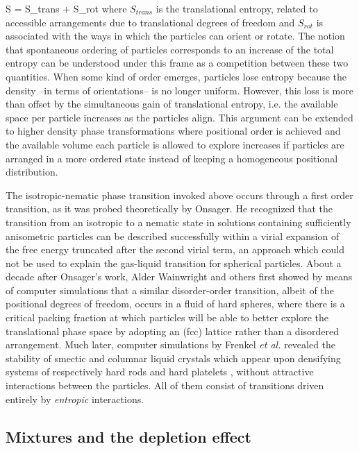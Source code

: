 \beq
S = S_{trans} + S_{rot}
\eeq
where $S_{trans}$ is the translational entropy, related to accessible arrangements due to translational degrees of freedom and $S_{rot}$ is associated with the ways in which the particles can orient or rotate. The notion that spontaneous ordering of particles corresponds to an increase of the total entropy can be understood under this frame as a competition between these two quantities. When some kind of order emerges, particles lose entropy because the density --in terms of orientations-- is no longer uniform. However, this loss is more than offset by the simultaneous gain of translational entropy, i.e.  the available space per particle increases as the particles align. This argument can be extended to higher density phase transformations where positional order is achieved and the available volume each particle is allowed to explore increases if particles are arranged in a more ordered state instead of keeping a homogeneous positional distribution.

The isotropic-nematic phase transition invoked above occurs through a first order transition, as it was probed theoretically by Onsager. He recognized that the transition from an isotropic to a nematic state in solutions containing sufficiently anisometric particles can be described successfully  within a virial expansion of the free energy truncated after the second virial term, an approach which could not be used to explain the gas-liquid transition for spherical particles. About a decade after Onsager's work, Alder Wainwright and others \cite{ALDER57,WOOD57} first showed by means of computer simulations that a similar disorder-order transition, albeit of the positional degrees of freedom, occurs in a fluid of hard spheres, where there is a critical packing fraction at which particles will be able to better explore the translational phase space by adopting an (fcc) lattice rather than a disordered arrangement. Much later, computer simulations by Frenkel {\em et al.}  revealed the stability of smectic and columnar liquid crystals which appear upon densifying systems of respectively hard rods \cite{Frenkel88} and hard platelets \cite{FrenkelLiqcryst,Veerman},  without  attractive interactions between the particles. All of them consist of transitions driven entirely by {\em entropic} interactions.




\subsection{Mixtures and the depletion effect}


